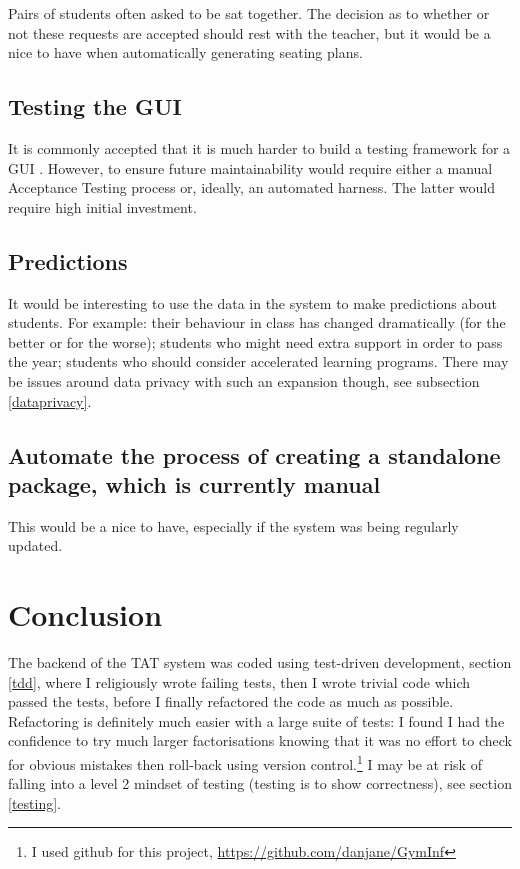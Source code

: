 \documentclass[10pt]{article}
\begin{document}
Pairs of students often asked to be sat together. The decision as to whether or not these requests are accepted should rest with the teacher, but it would be a nice to have when automatically generating seating plans.

\subsection{Testing the GUI}
It is commonly accepted that it is much harder to build a testing framework for a GUI \cite{Nass21}. However, to ensure future maintainability would require either a manual Acceptance Testing process \cite[p. 53]{Amman16} or, ideally, an automated harness. The latter would require high initial investment.

\subsection{Predictions}
It would be interesting to use the data in the system to make predictions about students. For example: their behaviour in class has changed dramatically (for the better or for the worse); students who might need extra support in order to pass the year; students who should consider accelerated learning programs. There may be issues around data privacy with such an expansion though, see subsection \ref{dataprivacy}.

\subsection{Automate the process of creating a standalone package, which is currently manual}
This would be a nice to have, especially if the system was being regularly updated.




\section{Conclusion} \label{conclusion} 

The backend of the TAT system was coded using test-driven development, section \ref{tdd}, where I religiously wrote failing tests, then I wrote trivial code which passed the tests, before I finally refactored the code as much as possible. Refactoring is definitely much easier with a large suite of tests: I found I had the confidence to try much larger factorisations knowing that it was no effort to check for obvious mistakes then roll-back using version control.\footnote{I used github for this project, \url{https://github.com/danjane/GymInf}} I may be at risk of falling into a level 2 mindset of testing (testing is to show correctness), see section \ref{testing}.
\end{document}
